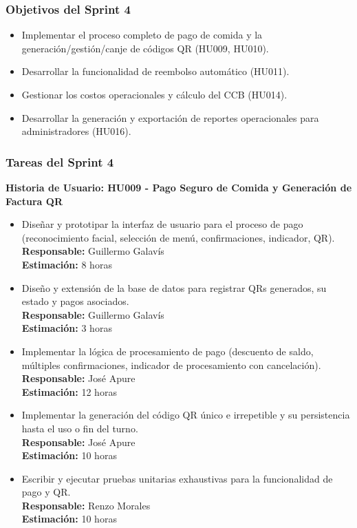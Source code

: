 \documentclass[12pt]{article}
\begin{document}
\subsubsection{Objetivos del Sprint 4}
\begin{itemize}
	\item Implementar el proceso completo de pago de comida y la generación/gestión/canje de códigos QR (HU009, HU010).
	\item Desarrollar la funcionalidad de reembolso automático (HU011).
	\item Gestionar los costos operacionales y cálculo del CCB (HU014).
	\item Desarrollar la generación y exportación de reportes operacionales para administradores (HU016).
\end{itemize}

\subsubsection{Tareas del Sprint 4}
\textbf{Historia de Usuario: HU009 - Pago Seguro de Comida y Generación de Factura QR}
\begin{itemize}
	\item Diseñar y prototipar la interfaz de usuario para el proceso de pago (reconocimiento facial, selección de menú, confirmaciones, indicador, QR). \\
	\textbf{Responsable:} Guillermo Galavís \\
	\textbf{Estimación:} 8 horas
	\item Diseño y extensión de la base de datos para registrar QRs generados, su estado y pagos asociados. \\
	\textbf{Responsable:} Guillermo Galavís \\
	\textbf{Estimación:} 3 horas
	\item Implementar la lógica de procesamiento de pago (descuento de saldo, múltiples confirmaciones, indicador de procesamiento con cancelación). \\
	\textbf{Responsable:} José Apure \\
	\textbf{Estimación:} 12 horas
	\item Implementar la generación del código QR único e irrepetible y su persistencia hasta el uso o fin del turno. \\
	\textbf{Responsable:} José Apure \\
	\textbf{Estimación:} 10 horas
	\item Escribir y ejecutar pruebas unitarias exhaustivas para la funcionalidad de pago y QR. \\
	\textbf{Responsable:} Renzo Morales \\
	\textbf{Estimación:} 10 horas
\end{itemize}
\end{document}
